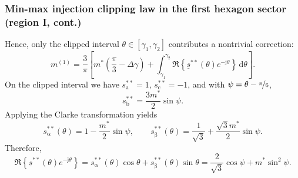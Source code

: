 \begin{frame}
    \frametitle{Min-max injection clipping law in the first hexagon sector (region I, cont.)}
    Hence, only the clipped interval $\theta \in [\gamma_1, \gamma_2]$ contributes a nontrivial correction:
    \begin{equation}
        m^{(1)} = \frac{3}{\pi}\left[m^*\left(\frac{\pi}{3}-\Delta\gamma\right) + \int_{\gamma_1}^{\gamma_2} \Re\!\left\{\underline{s}^{**}(\theta)e^{-\mathrm{j}\theta}\right\}\,\mathrm{d}\theta\right].
    \end{equation} \pause
    On the clipped interval we have $s_\mathrm{a}^{**}=1$, $s_\mathrm{c}^{**}=-1$, and with $\psi=\theta-\nicefrac{\pi}{6}$,
    \begin{equation}
        s_\mathrm{b}^{**} = \frac{3m^*}{2}\sin\psi.
    \end{equation} \pause
    Applying the Clarke transformation yields
    \begin{equation}
        s_{\upalpha}^{**}(\theta) = 1 - \frac{m^*}{2}\sin\psi,
        \qquad
        s_{\upbeta}^{**}(\theta) = \frac{1}{\sqrt{3}} + \frac{\sqrt{3}m^*}{2}\sin\psi.
    \end{equation}\pause
    Therefore,
    \begin{equation}
        \Re\!\left\{\underline{s}^{**}(\theta)e^{-\mathrm{j}\theta}\right\}
        = s_{\upalpha}^{**}(\theta)\cos\theta + s_{\upbeta}^{**}(\theta)\sin\theta
        = \frac{2}{\sqrt{3}}\cos\psi + m^*\sin^2\psi.
    \end{equation}
\end{frame}

